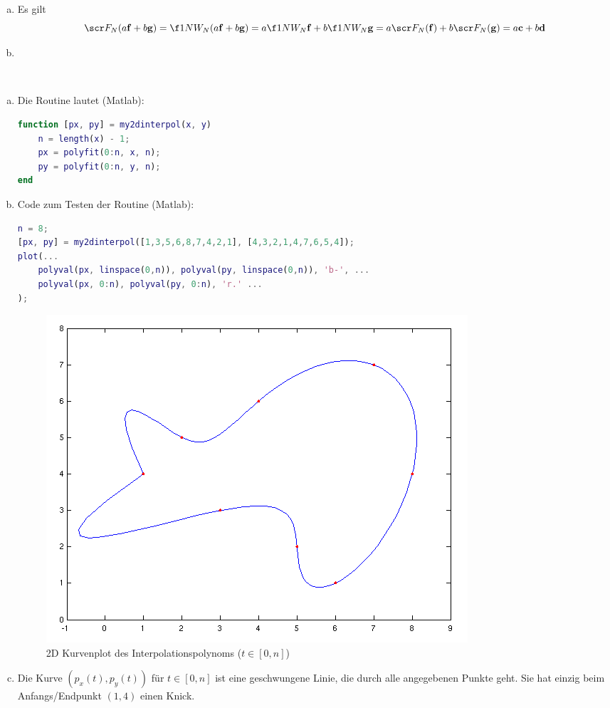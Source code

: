 \documentclass[a4paper]{scrartcl}
\begin{document}
\begin{aufgabe}
	\begin{enumerate}[a)]
		\item
			Es gilt
			\[
				\scr F_N(a\mathbf f + b\mathbf g) = \f 1N W_N (a\mathbf f + b\mathbf g) = a\f 1N W_N \mathbf f + b \f 1N W_N \mathbf g = a \scr F_N(\mathbf f) + b \scr F_N(\mathbf g) = a\mathbf c + b\mathbf d
			\]
		\item
	\end{enumerate}
\end{aufgabe}
\newpage
\begin{aufgabe}~

	\begin{enumerate}[a)]
		\item
			Die Routine lautet (Matlab):
			\begin{lstlisting}[language=matlab]
function [px, py] = my2dinterpol(x, y)
	n = length(x) - 1;
	px = polyfit(0:n, x, n);
	py = polyfit(0:n, y, n);
end
			\end{lstlisting}
		\item
			Code zum Testen der Routine (Matlab):
			\begin{lstlisting}[language=matlab]
n = 8;
[px, py] = my2dinterpol([1,3,5,6,8,7,4,2,1], [4,3,2,1,4,7,6,5,4]);
plot(...
	polyval(px, linspace(0,n)), polyval(py, linspace(0,n)), 'b-', ...
	polyval(px, 0:n), polyval(py, 0:n), 'r.' ...
);
			\end{lstlisting}
			\begin{figure}[h]
				\centering
				\caption{2D Kurvenplot des Interpolationspolynoms ($t\in [0,n]$)}
				\includegraphics[scale=0.7]{num1_3_4}
			\end{figure}
		\item
			Die Kurve $(p_x(t),p_y(t))$ für $t\in[0,n]$ ist eine geschwungene Linie, die durch alle angegebenen Punkte geht.
			Sie hat einzig beim Anfangs/Endpunkt $(1,4)$ einen Knick.
	\end{enumerate}

\end{aufgabe}
\end{document}
